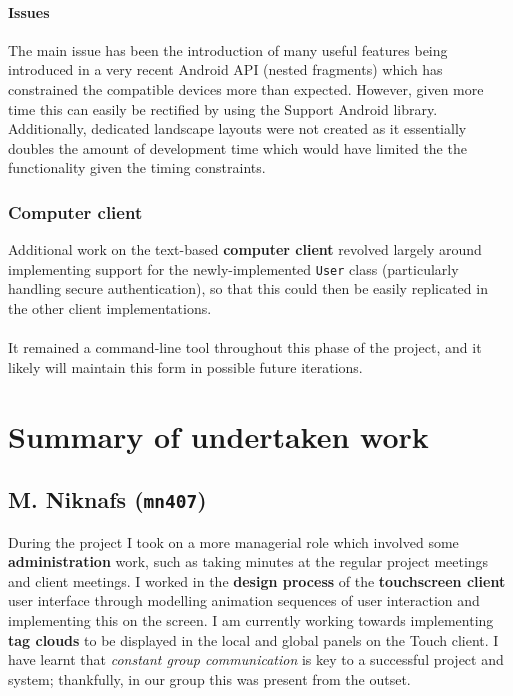 \documentclass[12p, a4paper, onecolumn]{report}
\begin{document}
\subsubsection{Issues}

The main issue has been the introduction of many useful features being introduced in a very recent Android API (nested fragments) which has constrained the compatible devices more than expected. However, given more time this can easily be rectified by using the Support Android library. Additionally, dedicated landscape layouts were not created as it essentially doubles the amount of development time which would have limited the the functionality given the timing constraints.

\subsection{Computer client}

Additional work on the text-based \textbf{computer client} revolved largely around implementing support for the newly-implemented \texttt{User} class (particularly handling secure authentication), so that this could then be easily replicated in the other client implementations. \\ \\
It remained a command-line tool throughout this phase of the project, and it likely will maintain this form in possible future iterations.

\chapter{Summary of undertaken work}

\section{M. Niknafs (\texttt{mn407})}

During the project I took on a more managerial role which involved some \textbf{administration} work, such as taking minutes at the regular project meetings and client meetings. I worked in the \textbf{design process} of the \textbf{touchscreen client} user interface through modelling animation sequences of user interaction and implementing this on the screen. I am currently working towards implementing \textbf{tag clouds} to be displayed in the local and global panels on the Touch client. I have learnt that \emph{constant group communication} is key to a successful project and system; thankfully, in our group this was present from the outset.
\end{document}
